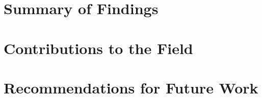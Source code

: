\label{ch:conclusion}
\section{Summary of Findings}

\section{Contributions to the Field}

\section{Recommendations for Future Work}